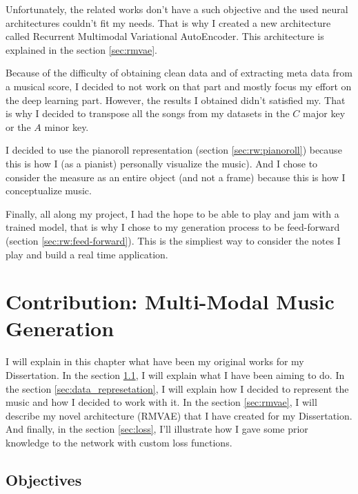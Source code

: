 \documentclass[12pt]{report}
\begin{document}
Unfortunately, the related works don't have a such objective and the used neural architectures couldn't fit my needs.
That is why I created a new architecture called Recurrent Multimodal Variational AutoEncoder.
This architecture is explained in the section \ref{sec:rmvae}.

Because of the difficulty of obtaining clean data and of extracting meta data from a musical score, I decided to not work on that part and mostly focus my effort on the deep learning part.
However, the results I obtained didn't satisfied my.
That is why I decided to transpose all the songs from my datasets in the $C$ major key or the $A$ minor key.

I decided to use the pianoroll representation (section \ref{sec:rw:pianoroll}) because this is how I (as a pianist) personally visualize the music).
And I chose to consider the measure as an entire object (and not a frame) because this is how I conceptualize music.

Finally, all along my project, I had the hope to be able to play and jam with a trained model, that is why I chose to my generation process to be feed-forward (section \ref{sec:rw:feed-forward}).
This is the simpliest way to consider the notes I play and build a real time application.

\newpage
\chapter{Contribution: Multi-Modal Music Generation}
\label{chap:contribution}

I will explain in this chapter what have been my original works for my Dissertation.
In the section \ref{sec:objectives}, I will explain what I have been aiming to do.
In the section \ref{sec:data_represetation}, I will explain how I decided to represent the music and how I decided to work with it.
In the section \ref{sec:rmvae}, I will describe my novel architecture (RMVAE) that I have created for my Dissertation.
And finally, in the section \ref{sec:loss}, I'll illustrate how I gave some prior knowledge to the network with custom loss functions.


\section{Objectives}
\label{sec:objectives}
\end{document}
